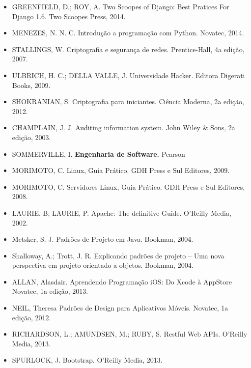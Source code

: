 \begin{itemize}
    \item GREENFIELD, D.; ROY, A.
          Two Scoopes of Django: Best Pratices For Django 1.6.
          Two Scoopes Press, 2014.

    \item MENEZES, N. N. C.
          Introdução a programação com Python.
          Novatec, 2014.
	\item STALLINGS, W.
	    Criptografia e segurança de redes.
	    Prentice-Hall, 4a edição, 2007.

	\item ULBRICH, H. C.; DELLA VALLE, J.
	    Universidade Hacker.
	    Editora Digerati Books, 2009.

	\item SHOKRANIAN, S.
	    Criptografia para iniciantes.
	    Ciência Moderna, 2a edição, 2012.

	\item CHAMPLAIN, J. J.
	    Auditing information system.
	    John Wiley \& Sons, 2a edição, 2003.
	\item  SOMMERVILLE, I. \textbf{Engenharia de Software.} Pearson
    \item MORIMOTO, C.
          Linux, Guia Prático.
          GDH Press e Sul Editores, 2009.

    \item MORIMOTO, C.
          Servidores Linux, Guia Prático.
          GDH Press e Sul Editores, 2008.

    \item LAURIE, B; LAURIE, P.
          Apache: The definitive Guide.
          O'Reilly Media, 2002.
	\item Metsker, S. J. Padrões de Projeto em Java. Bookman, 2004.
	\item Shalloway, A.; Trott, J. R. Explicando padrões de projeto – Uma nova perspectiva em projeto orientado a objetos. Bookman, 2004.
    \item ALLAN, Alasdair.
          Aprendendo Programação iOS: Do Xcode à AppStore
          Novatec, 1a edição, 2013.

    \item NEIL, Theresa
          Padrões de Design para Aplicativos Móveis.
          Novatec, 1a edição, 2012.
    \item RICHARDSON, L.; AMUNDSEN, M.; RUBY, S.
          Restful Web APIs.
          O'Reilly Media, 2013.

    \item SPURLOCK, J.
          Bootstrap.
          O'Reilly Media, 2013.


\end{itemize}
